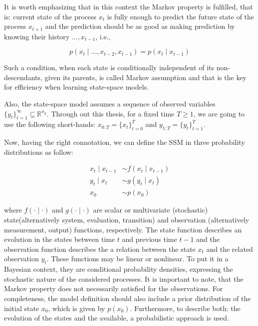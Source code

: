 It is worth emphasizing that in this context the Markov property is fulfilled, that is: current state of the process \(x_t\) is fully enough to predict the future state of the process \(x_{t+1}\) and the prediction should be as good as making prediction by knowing their history \(...,x_{t-1}\), i.e.,

\begin{equation}
p(x_t \mid ...,x_{t-2},x_{t-1}) = p(x_t \mid x_{t-1}) \label{eq:markov_assumption}
\end{equation}

Such a condition, when each state is conditionally independent of its non-descendants, given its parents, is called Markov assumption and that is the key for efficiency when learning state-space models.

Also, the state-space model assumes a sequence of observed variables \(\{y_t\}^\infty_{t=1} \subseteq \mathbb{R}^{n_y} \). Through out this thesis, for a fixed time \(T \geq 1 \), we are going to use the following short-hands: \(x_{0:T} = \{x_t\}^T_{t=0}\) and \(y_{1:T} = \{y_t\}^T_{t=1}\). 

Now, having the right connotation, we can define the SSM  in three probability distributions as follow:

\begin{subequations}
\begin{align}
 x_t \mid x_{t-1}  &\sim f(x_t \mid x_{t-1}) \label{eq:ssm_in_probabilities_subeq_evolution} \\
 y_t \mid x_t  &\sim g(y_t \mid x_t) \label{eq:ssm_in_probabilities_subeq_measurement} \\
 x_0 &\sim p(x_0) \label{eq:ssm_in_probabilities_subeq_prior_initial_state}
\end{align}
\label{eq:ssm_in_probabilities}
\end{subequations}

\noindent where \(f(\cdot \mid \cdot)\) and \(g(\cdot \mid \cdot )\) are scalar or multivariate (stochastic) state(alternatively system, evaluation, transition) and observation (alternatively measurement, output) functions, respectively.
The state function describes an evolution in the states between time \(t\) and previous time \(t-1\) and the observation function describes the a relation between the state \(x_t\) and the related observation \(y_t\). These functions may be linear or nonlinear. To put it in a Bayesian context, they are conditional probability densities, expressing the stochastic nature of the considered processes. It is important to note, that the Markov property does not necessarily satisfied for the observations. For completeness, the model definition should also include a prior distribution of the initial state \(x_0\), which is given by \(p(x_0)\). Furthermore, to describe both: the evolution of the states and the available, a probabilistic approach is used.

